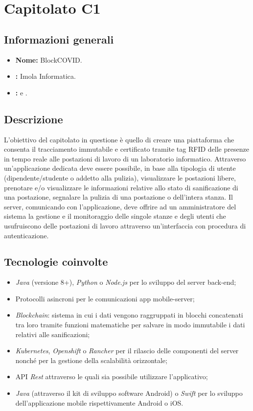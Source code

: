 \section{Capitolato C1}

\subsection{Informazioni generali}{
\begin{itemize}
\item \textbf{Nome:} BlockCOVID.
\item \textbf{\commitProg:} Imola Informatica.
\item \textbf{\proponProg:} \VT{} e \CR.
\end{itemize}
}

\subsection{Descrizione}{
L'obiettivo del capitolato in questione è quello di creare una piattaforma che consenta il tracciamento immutabile e certificato tramite tag RFID delle presenze in tempo reale alle postazioni di lavoro di un laboratorio informatico. Attraverso un'applicazione dedicata deve essere possibile, in base alla tipologia di utente (dipendente/studente o addetto alla pulizia), visualizzare le postazioni libere, prenotare e/o visualizzare le informazioni relative allo stato di sanificazione di una postazione, segnalare la pulizia di una postazione o dell'intera stanza. Il server, comunicando con l'applicazione, deve offrire ad un amministratore del sistema la gestione e il monitoraggio delle singole stanze e degli utenti che usufruiscono delle postazioni di lavoro attraverso un'interfaccia con procedura di autenticazione.

}

\subsection{Tecnologie coinvolte}{
\begin{itemize}
\item \textit{Java} (versione 8+), \textit{Python} o \textit{Node.js} per lo sviluppo del server back-end;
\item Protocolli asincroni per le comunicazioni app mobile-server;
\item \textit{Blockchain}: sistema in cui i dati vengono raggruppati in blocchi concatenati tra loro tramite funzioni matematiche per salvare in modo immutabile i dati relativi alle sanificazioni;
\item \textit{Kubernetes}, \textit{Openshift} o \textit{Rancher} per il rilascio delle componenti
del server nonché per la gestione della scalabilità orizzontale;
\item API \textit{Rest} attraverso le quali sia possibile utilizzare l'applicativo;
\item \textit{Java} (attraverso il kit di sviluppo software Android) o \textit{Swift} per lo sviluppo dell'applicazione mobile rispettivamente Android o iOS.
\end{itemize}
}

